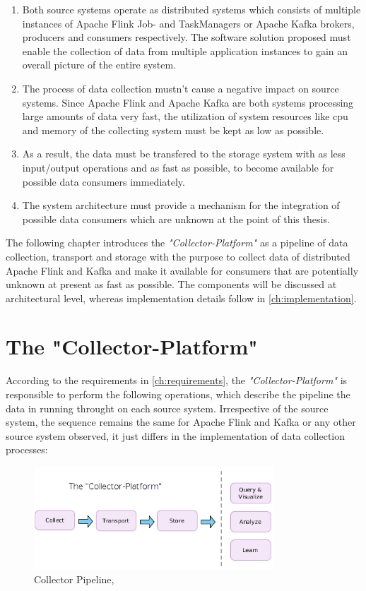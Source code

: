 \begin{enumerate}
    \item Both source systems operate as distributed systems which consists of multiple instances of Apache
    Flink Job- and TaskManagers or Apache Kafka brokers, producers and consumers respectively. The software solution proposed
    must enable the collection of data from multiple application instances to gain an overall picture of the entire system.
    \item The process of data collection mustn't cause a negative impact on source systems. Since Apache Flink and Apache Kafka
    are both systems processing large amounts of data very fast, the utilization of system resources like cpu and memory of the
    collecting system must be kept as low as possible.
    \item As a result, the data must be transfered to the storage system with as less input/output operations and as fast
    as possible, to become available for possible data consumers immediately.
    \item The system architecture must provide a mechanism for the integration of possible data consumers which are unknown at
    the point of this thesis.
\end{enumerate}

The following chapter introduces the \textit{"Collector-Platform"} as a pipeline of data collection, transport and storage with the purpose
to collect data of distributed Apache Flink and Kafka and make it available for consumers that are potentially unknown at present
as fast as possible. The components will be discussed at architectural level, whereas implementation details follow in \autoref{ch:implementation}.

\section{The "Collector-Platform"}

According to the requirements in \autoref{ch:requirements}, the \textit{"Collector-Platform"} is responsible to perform the
following operations, which describe the pipeline the data in running throught on each source system. Irrespective of the source system,
the sequence remains the same for Apache Flink and Kafka or any other source system observed, it just differs in the implementation of
data collection processes:

\begin{figure}[H]
	\centering
	\includegraphics[width=0.8\textwidth]{../images/06-collect-pipeline.jpg}
	\caption{Collector Pipeline, \cite{VanL14}}
	\label{fig:colletor-pipeline}
\end{figure}

